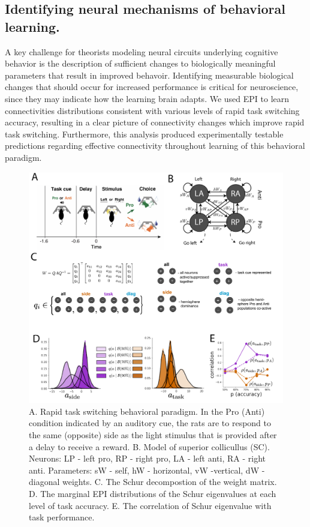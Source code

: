 \documentclass[11pt]{article}
\begin{document}
\subsection{Identifying neural mechanisms of behavioral learning.} 
A key challenge for theorists modeling neural circuits underlying cognitive behavior is the description of sufficient changes to biologically meaningful parameters that result in improved behavoir.
Identifying measurable biological changes that should occur for increased performance is critical for neuroscience, since they may indicate how the learning brain adapts.  
We used EPI to learn connectivities distributions consistent with various levels of rapid task switching accuracy, resulting in a clear picture of connectivity changes which improve rapid task switching.
Furthermore, this analysis produced experimentally testable predictions regarding effective connectivity throughout learning of this behavioral paradigm.

\begin{figure}
\begin{center}
\includegraphics[scale=0.4]{figs/fig4/fig4.pdf}
\end{center}
\caption{A. Rapid task switching behavioral paradigm. In the Pro (Anti) condition indicated by an auditory cue, the rats are to respond to the same (opposite) side as the light stimulus that is provided after a delay to receive a reward. B. Model of superior collicullus (SC). Neurons: LP - left pro, RP - right pro, LA - left anti, RA - right anti.  Parameters: sW - self, hW - horizontal, vW -vertical, dW - diagonal weights. C. The Schur decompostion of the weight matrix. D. The marginal EPI distributions of the Schur eigenvalues at each level of task accuracy. E. The correlation of Schur eigenvalue with task performance.}
\end{figure}
\end{document}
